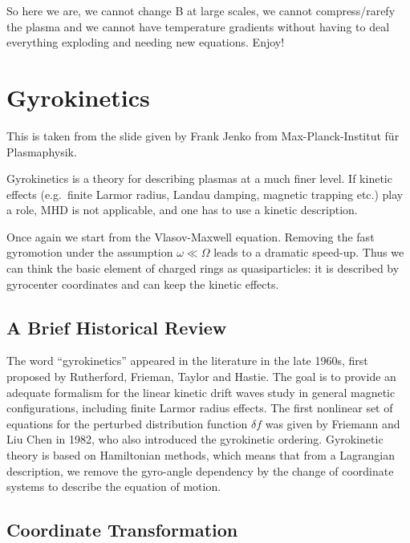 \documentclass[
  notoc %
]{tufte-book}
\begin{document}
So here we are, we cannot change B at large scales, we cannot
compress/rarefy the plasma and we cannot have temperature gradients
without having to deal everything exploding and needing new equations.
Enjoy!

\hypertarget{sec:gyrokinetics}{%
\chapter{Gyrokinetics}\label{sec:gyrokinetics}}

This is taken from the slide given by Frank Jenko from
Max-Planck-Institut für Plasmaphysik.

Gyrokinetics is a theory for describing plasmas at a much finer level.
If kinetic effects (e.g.~finite Larmor radius, Landau damping, magnetic
trapping etc.) play a role, MHD is not applicable, and one has to use a
kinetic description.

Once again we start from the Vlasov-Maxwell equation. Removing the fast
gyromotion under the assumption \(\omega\ll\Omega\) leads to a dramatic
speed-up. Thus we can think the basic element of charged rings as
quasiparticles: it is described by gyrocenter coordinates and can keep
the kinetic effects.

\hypertarget{a-brief-historical-review}{%
\section{A Brief Historical Review}\label{a-brief-historical-review}}

The word ``gyrokinetics'' appeared in the literature in the late 1960s,
first proposed by Rutherford, Frieman, Taylor and Hastie. The goal is to
provide an adequate formalism for the linear kinetic drift waves study
in general magnetic configurations, including finite Larmor radius
effects. The first nonlinear set of equations for the perturbed
distribution function \(\delta f\) was given by Friemann and Liu Chen in
1982, who also introduced the gyrokinetic ordering. Gyrokinetic theory
is based on Hamiltonian methods, which means that from a Lagrangian
description, we remove the gyro-angle dependency by the change of
coordinate systems to describe the equation of motion.

\hypertarget{coordinate-transformation}{%
\section{Coordinate Transformation}\label{coordinate-transformation}}
\end{document}
